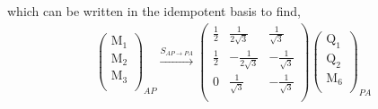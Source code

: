 \documentclass[12pt,a4paper]{article}
\newcounter{arrow}
\begin{document}
which can be written in the idempotent basis to find,
\begin{align}\left( \begin{matrix}
\text{M}_1\\
\text{M}_2\\
\text{M}_3\\
\end{matrix} \right)_{AP}
\xrightarrow{S_{AP \rightarrow PA}}
\left( \begin{matrix}
\frac{1}{2} & \frac{1}{2 \sqrt{3}} &  \frac{1}{\sqrt{3}} \\
\frac{1}{2} & - \frac{1}{2\sqrt{3}} & -\frac{1}{\sqrt{3}} \\
0& \frac{1}{\sqrt{3}} & -\frac{1}{\sqrt{3}} \\
\end{matrix} \right)
\left( \begin{matrix}
\text{Q}_1\\
\text{Q}_2\\
\text{M}_6\\
\end{matrix} \right)_{PA}
\end{align}
\end{document}
